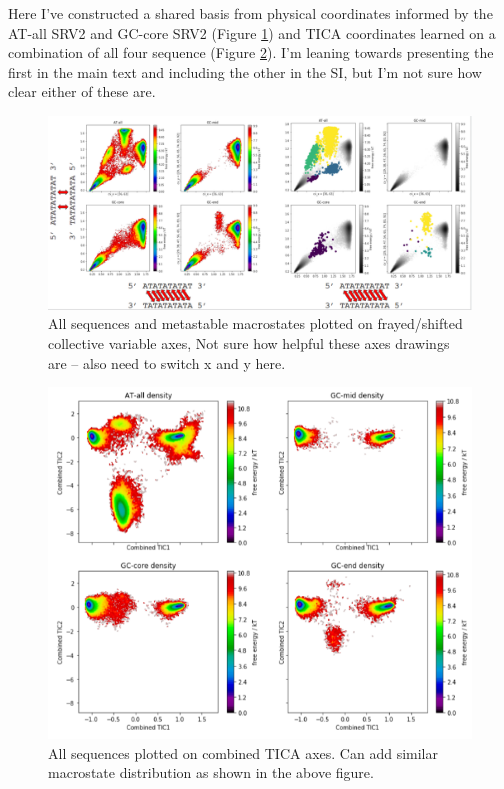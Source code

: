 \documentclass[journal=jpcbfk,manuscript=article]{achemso}
\begin{document}
Here I've constructed a shared basis from physical coordinates informed by the AT-all SRV2 and GC-core SRV2 (Figure \ref{fig:all_seq_physical_cvs_labels}) and TICA coordinates learned on a combination of all four sequence (Figure \ref{fig:all_seq_tica_cvs}). I'm leaning towards presenting the first in the main text and including the other in the SI, but I'm not sure how clear either of these are.

\begin{figure}[ht!]
	\begin{center}
        \includegraphics[width=\textwidth]{Figs/figs_0804/all_seq_physical_cvs_labels.PNG}
        \caption{All sequences and metastable macrostates plotted on frayed/shifted collective variable axes, Not sure how helpful these axes drawings are -- also need to switch x and y here.}
        \label{fig:all_seq_physical_cvs_labels}
	\end{center}
\end{figure}

\begin{figure}[ht!]
	\begin{center}
        \includegraphics[width=\textwidth]{Figs/figs_0804/all_seq_tica_cvs.PNG}
        \caption{All sequences plotted on combined TICA axes. Can add similar macrostate distribution as shown in the above figure.}
        \label{fig:all_seq_tica_cvs}
	\end{center}
\end{figure}
\end{document}
